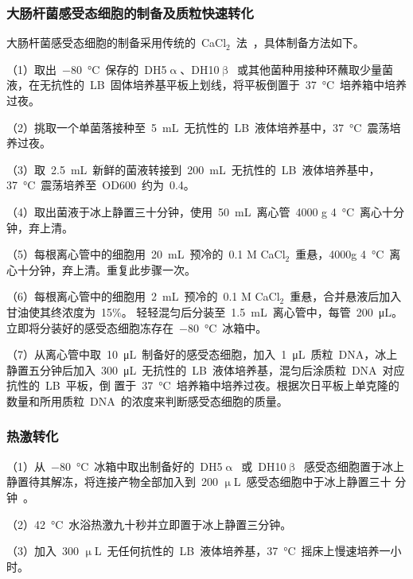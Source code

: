 \subsubsection{大肠杆菌感受态细胞的制备及质粒快速转化}
大肠杆菌感受态细胞的制备采用传统的\ CaCl$_2$\ 法\ \citep{Hanahan1991,Reusch1986,Addison2004}，具体制备方法如下。

（1）取出\ \SI{-80}{\degreeCelsius}\ 保存的\ DH5$\upalpha$、DH10$\upbeta$\ 或其他菌种用接种环蘸取少量菌液，在无抗性的\ LB\ 固体培养基平板上划线，将平板倒置于\ \SI{37}{\degreeCelsius}\ 培养箱中培养过夜。

（2）挑取一个单菌落接种至\ \SI{5}{\mL}\ 无抗性的\ LB\ 液体培养基中，\SI{37}{\degreeCelsius}\ 震荡培养过夜。

（3）取\ \SI{2.5}{\mL}\ 新鲜的菌液转接到\ \SI{200}{\mL}\ 无抗性的\ LB\ 液体培养基中，\SI{37}{\degreeCelsius}\ 震荡培养至\ OD600\ 约为\ 0.4。

（4）取出菌液于冰上静置三十分钟，使用\ \SI{50}{\mL}\ 离心管\ 4000 g \SI{4}{\degreeCelsius}\ 离心十分钟，弃上清。

（5）每根离心管中的细胞用\ \SI{20}{\mL}\ 预冷的\ 0.1 M CaCl$_2$\ 重悬，4000g \SI{4}{\degreeCelsius}\ 离心十分钟，弃上清。重复此步骤一次。

（6）每根离心管中的细胞用\ \SI{2}{\mL}\ 预冷的\ 0.1 M CaCl$_2$\ 重悬，合并悬液后加入甘油使其终浓度为\ 15\%。 轻轻混匀后分装至\ \SI{1.5}{\mL}\ 离心管中，每管\ \SI{200}{\uL}。立即将分装好的感受态细胞冻存在\ \SI{-80}{\degreeCelsius}\ 冰箱中。

（7）从离心管中取\ \SI{10}{\uL}\ 制备好的感受态细胞，加入\ \SI{1}{\uL}\ 质粒\ DNA，冰上静置五分钟后加入\ \SI{300}{\uL}\ 无抗性的\ LB\ 液体培养基，混匀后涂质粒\ DNA\ 对应抗性的\ LB\ 平板，倒
置于\ \SI{37}{\degreeCelsius}\ 培养箱中培养过夜。根据次日平板上单克隆的数量和所用质粒\ DNA\ 的浓度来判断感受态细胞的质量。

\subsubsection{热激转化}\label{subsub:heat transformation}
（1）从\ \SI{-80}{\degreeCelsius}\ 冰箱中取出制备好的\ DH5$\upalpha$\ 或\ DH10$\upbeta$\ 感受态细胞置于冰上静置待其解冻，将连接产物全部加入到\ 200 $\upmu$L\ 感受态细胞中于冰上静置三十
分钟\ \citep{Hanahan1991,Reusch1986,Addison2004}。

（2）\SI{42}{\degreeCelsius}\ 水浴热激九十秒并立即置于冰上静置三分钟。

（3）加入\ 300 $\upmu$L\ 无任何抗性的\ LB\ 液体培养基，\SI{37}{\degreeCelsius}\ 摇床上慢速培养一小时。

